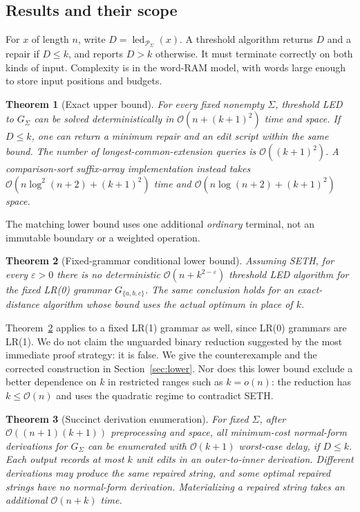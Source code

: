 \documentclass[sigconf,screen]{acmart}
\newcommand{\LED}{\operatorname{led}}
\newcommand{\Pal}{\mathcal P}
\newcommand{\eps}{\varepsilon}
\newcommand{\Oh}{\mathcal O}
\newtheorem{theorem}{Theorem}
\theoremstyle{definition}
\begin{document}
\subsection{Results and their scope}
For $x$ of length $n$, write $D=\LED_{\Pal_\Sigma}(x)$. A threshold algorithm returns $D$ and a repair if $D\le k$, and reports $D>k$ otherwise. It must terminate correctly on both kinds of input. Complexity is in the word-RAM model, with words large enough to store input positions and budgets.

\begin{theorem}[Exact upper bound]\label{thm:upper}
For every fixed nonempty $\Sigma$, threshold LED to $G_\Sigma$ can be solved deterministically in $\Oh(n+(k+1)^2)$ time and space. If $D\le k$, one can return a minimum repair and an edit script within the same bound. The number of longest-common-extension queries is $\Oh((k+1)^2)$. A comparison-sort suffix-array implementation instead takes $\Oh(n\log^2(n+2)+(k+1)^2)$ time and $\Oh(n\log(n+2)+(k+1)^2)$ space.
\end{theorem}

The matching lower bound uses one additional \emph{ordinary} terminal, not an immutable boundary or a weighted operation.

\begin{theorem}[Fixed-grammar conditional lower bound]\label{thm:lower}
Assuming SETH, for every $\eps>0$ there is no deterministic $\Oh(n+k^{2-\eps})$ threshold LED algorithm for the fixed LR(0) grammar $G_{\{a,b,c\}}$. The same conclusion holds for an exact-distance algorithm whose bound uses the actual optimum in place of $k$.
\end{theorem}

Theorem~\ref{thm:lower} applies to a fixed LR(1) grammar as well, since LR(0) grammars are LR(1). We do not claim the unguarded binary reduction suggested by the most immediate proof strategy: it is false. We give the counterexample and the corrected construction in Section~\ref{sec:lower}. Nor does this lower bound exclude a better dependence on $k$ in restricted ranges such as $k=o(n)$: the reduction has $k\le\Oh(n)$ and uses the quadratic regime to contradict SETH.

\begin{theorem}[Succinct derivation enumeration]\label{thm:enum}
For fixed $\Sigma$, after $\Oh((n+1)(k+1))$ preprocessing and space, all minimum-cost \emph{normal-form derivations} for $G_\Sigma$ can be enumerated with $\Oh(k+1)$ worst-case delay, if $D\le k$. Each output records at most $k$ unit edits in an outer-to-inner derivation. Different derivations may produce the same repaired string, and some optimal repaired strings have no normal-form derivation. Materializing a repaired string takes an additional $\Oh(n+k)$ time.
\end{theorem}
\end{document}

